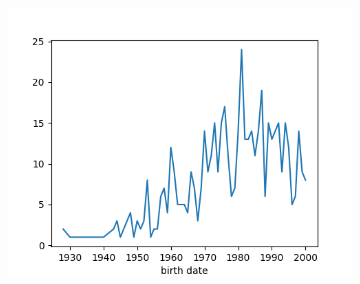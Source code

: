 \begin{figure}[!ht]
    \vspace{5mm}

    \begin{subfigure}[!ht]{.5\linewidth}
        \label{fig:birth-date-hist-targets}
        \centering
        \includegraphics[width=\textwidth]{./img/birth-date-freq-targets.png}
    \end{subfigure}
\end{figure}


